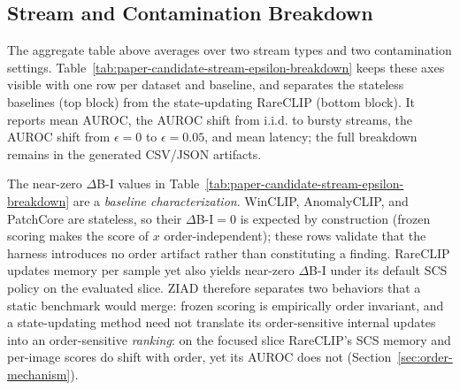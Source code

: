 \documentclass[runningheads]{llncs}
\newcommand{\tabref}[1]{Table~\ref{#1}}
\newcommand{\secref}[1]{Section~\ref{#1}}
\begin{document}
\subsection{Stream and Contamination Breakdown}
\label{sec:stream-contamination}
The aggregate table above averages over two stream types and two contamination
settings. \tabref{tab:paper-candidate-stream-epsilon-breakdown} keeps these
axes visible with one row per dataset and baseline, and separates the stateless
baselines (top block) from the state-updating RareCLIP (bottom block). It reports
mean AUROC, the AUROC shift from i.i.d. to bursty streams, the AUROC shift from
\(\epsilon=0\) to \(\epsilon=0.05\), and mean latency; the full breakdown remains
in the generated CSV/JSON artifacts.

\begin{table}[t]
\centering
\small
\caption{Compact stream and contamination summary. \emph{Stateless} block (top):
$\Delta$B-I${=}0$ is expected by construction (frozen scoring is order-independent),
so these rows validate that the harness adds no order artifact---not a finding.
\emph{State-updating} block (bottom): the non-trivial RareCLIP $\Delta$B-I$\approx$0
with active SCS updates. \(\Delta\)B-I is bursty minus i.i.d.\ AUROC;
\(\Delta\epsilon\) is \(\epsilon{=}0.05\) minus \(\epsilon{=}0\) AUROC; positive
controls in \tabref{tab:online-memory-detector-comparison}.}
\label{tab:paper-candidate-stream-epsilon-breakdown}
\resizebox{0.96\textwidth}{!}{}
\end{table}

The near-zero $\Delta$B-I values in
\tabref{tab:paper-candidate-stream-epsilon-breakdown} are a \emph{baseline
characterization}. WinCLIP, AnomalyCLIP, and PatchCore are stateless, so their
$\Delta$B-I${=}0$ is expected by construction (frozen scoring makes the score of
$x$ order-independent); these rows validate that the harness introduces no order
artifact rather than constituting a finding. RareCLIP updates memory per sample
yet also yields near-zero $\Delta$B-I under its default SCS policy on the
evaluated slice. ZIAD therefore separates two behaviors that a static benchmark would
merge: frozen scoring is empirically order invariant, and a state-updating
method need not translate its order-sensitive internal updates into an
order-sensitive \emph{ranking}: on the focused slice RareCLIP's SCS memory and
per-image scores do shift with order, yet its AUROC does not
(\secref{sec:order-mechanism}).
\end{document}
